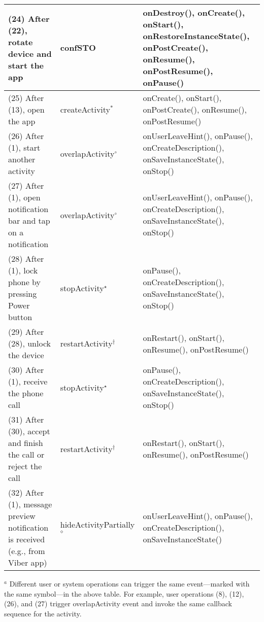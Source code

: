 \documentclass[10pt]{elsarticle}
\begin{document}
\begin{ThreePartTable}
\begin{scriptsize}
\begin{longtable}{P{3.2cm} P{1.5cm} P{5.9cm}}
(24) After (22), rotate device and start the app & confSTO & {\ttfamily onDestroy()}, {\ttfamily onCreate()}, {\ttfamily onStart()}, {\ttfamily onRestoreInstanceState()}, {\ttfamily onPostCreate()},  {\ttfamily onResume()}, {\ttfamily onPostResume()}, {\ttfamily onPause()}\\ \hline
(25) After (13), open the app & createActivity${^\ast}$ & {\ttfamily onCreate()}, {\ttfamily onStart()}, {\ttfamily onPostCreate()}, {\ttfamily onResume()}, {\ttfamily onPostResume()}\\ \hline
(26) After (1), start another activity & overlapActivity${^\circ}$ & {\ttfamily onUserLeaveHint()}, {\ttfamily onPause()}, {\ttfamily onCreateDescription()}, {\ttfamily onSaveInstanceState()}, {\ttfamily onStop()}\\ \hline
(27) After (1), open notification bar and tap on a notification & overlapActivity${^\circ}$ & {\ttfamily onUserLeaveHint()}, {\ttfamily onPause()}, {\ttfamily onCreateDescription()}, {\ttfamily onSaveInstanceState()}, {\ttfamily onStop()} \\ \hline
(28) After (1), lock phone by pressing Power button & stopActivity${^\star}$ & {\ttfamily onPause()}, {\ttfamily onCreateDescription()}, {\ttfamily onSaveInstanceState()}, {\ttfamily onStop()}\\ \hline
(29) After (28), unlock the device & restartActivity${^\dagger}$ & {\ttfamily onRestart()}, {\ttfamily onStart()}, {\ttfamily onResume()}, {\ttfamily onPostResume()}\\ \hline
(30) After (1), receive the phone call & stopActivity${^\star}$ & {\ttfamily onPause()}, {\ttfamily onCreateDescription()}, {\ttfamily onSaveInstanceState()}, {\ttfamily onStop()}\\ \hline
(31) After (30), accept and finish the call or reject the call & restartActivity${^\dagger}$ & {\ttfamily onRestart()}, {\ttfamily onStart()}, {\ttfamily onResume()}, {\ttfamily onPostResume()}\\ \hline
(32) After (1), message preview notification is received (e.g., from Viber \cite{viber} app) & hideActivityPartially${^\diamond}$ & {\ttfamily onUserLeaveHint()}, {\ttfamily onPause()}, {\ttfamily onCreateDescription()}, {\ttfamily onSaveInstanceState()} 
\end{longtable}
  \begin{tablenotes}
    \item[$^{a}$]{Different user or system operations can trigger the same event---marked with the same symbol---in the above table. For example, user operations (8), (12), (26), and (27) trigger overlapActivity event and invoke the same callback sequence for the activity.}
    \end{tablenotes}
\end{scriptsize}    
\end{ThreePartTable}
\end{document}
